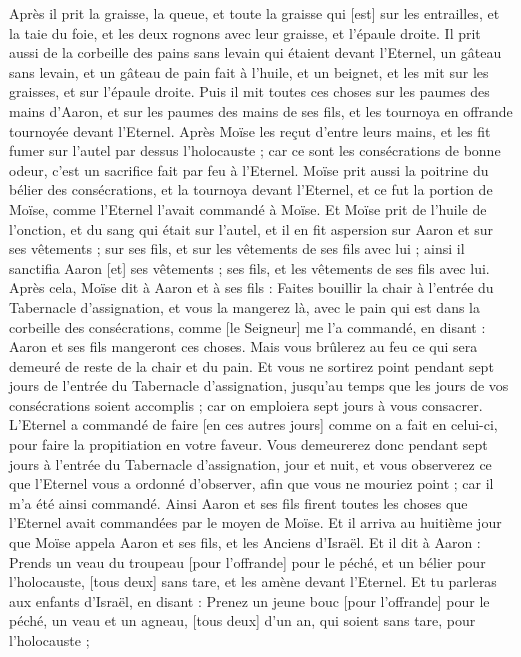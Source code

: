 \begin{multicols}{2}
Après il prit la graisse, la queue, et toute la graisse qui [est] sur les entrailles, et la taie du foie, et les deux rognons avec leur graisse, et l'épaule droite.
Il prit aussi de la corbeille des pains sans levain qui étaient devant l'Eternel, un gâteau sans levain, et un gâteau de pain fait à l'huile, et un beignet, et les mit sur les graisses, et sur l'épaule droite.
Puis il mit toutes ces choses sur les paumes des mains d'Aaron, et sur les paumes des mains de ses fils, et les tournoya en offrande tournoyée devant l'Eternel.
Après Moïse les reçut d'entre leurs mains, et les fit fumer sur l'autel par dessus l'holocauste ; car ce sont les consécrations de bonne odeur, c'est un sacrifice fait par feu à l'Eternel.
Moïse prit aussi la poitrine du bélier des consécrations, et la tournoya devant l'Eternel, et ce fut la portion de Moïse, comme l'Eternel l'avait commandé à Moïse.
Et Moïse prit de l'huile de l'onction, et du sang qui était sur l'autel, et il en fit aspersion sur Aaron et sur ses vêtements ; sur ses fils, et sur les vêtements de ses fils avec lui ; ainsi il sanctifia Aaron [et] ses vêtements ; ses fils, et les vêtements de ses fils avec lui.
Après cela, Moïse dit à Aaron et à ses fils : Faites bouillir la chair à l'entrée du Tabernacle d'assignation, et vous la mangerez là, avec le pain qui est dans la corbeille des consécrations, comme [le Seigneur] me l'a commandé, en disant : Aaron et ses fils mangeront ces choses.
Mais vous brûlerez au feu ce qui sera demeuré de reste de la chair et du pain.
Et vous ne sortirez point pendant sept jours de l'entrée du Tabernacle d'assignation, jusqu'au temps que les jours de vos consécrations soient accomplis ; car on emploiera sept jours à vous consacrer.
L'Eternel a commandé de faire [en ces autres jours] comme on a fait en celui-ci, pour faire la propitiation en votre faveur.
Vous demeurerez donc pendant sept jours à l'entrée du Tabernacle d'assignation, jour et nuit, et vous observerez ce que l'Eternel vous a ordonné d'observer, afin que vous ne mouriez point ; car il m'a été ainsi commandé.
Ainsi Aaron et ses fils firent toutes les choses que l'Eternel avait commandées par le moyen de Moïse.
\VerseOne{}Et il arriva au huitième jour que Moïse appela Aaron et ses fils, et les Anciens d'Israël.
Et il dit à Aaron : Prends un veau du troupeau [pour l'offrande] pour le péché, et un bélier pour l'holocauste, [tous deux] sans tare, et les amène devant l'Eternel.
Et tu parleras aux enfants d'Israël, en disant : Prenez un jeune bouc [pour l'offrande] pour le péché, un veau et un agneau, [tous deux] d'un an, qui soient sans tare, pour l'holocauste ;

\end{multicols}
